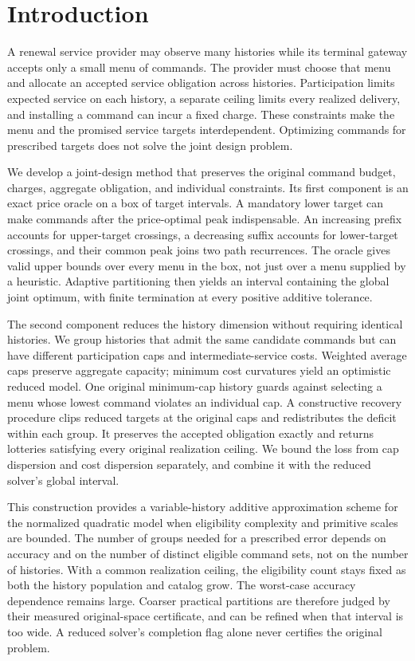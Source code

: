 \section{Introduction}
A renewal service provider may observe many histories while its terminal gateway accepts only a small menu of commands. The provider must choose that menu and allocate an accepted service obligation across histories. Participation limits expected service on each history, a separate ceiling limits every realized delivery, and installing a command can incur a fixed charge. These constraints make the menu and the promised service targets interdependent. Optimizing commands for prescribed targets does not solve the joint design problem.

We develop a joint-design method that preserves the original command budget, charges, aggregate obligation, and individual constraints. Its first component is an exact price oracle on a box of target intervals. A mandatory lower target can make commands after the price-optimal peak indispensable. An increasing prefix accounts for upper-target crossings, a decreasing suffix accounts for lower-target crossings, and their common peak joins two path recurrences. The oracle gives valid upper bounds over every menu in the box, not just over a menu supplied by a heuristic. Adaptive partitioning then yields an interval containing the global joint optimum, with finite termination at every positive additive tolerance.

The second component reduces the history dimension without requiring identical histories. We group histories that admit the same candidate commands but can have different participation caps and intermediate-service costs. Weighted average caps preserve aggregate capacity; minimum cost curvatures yield an optimistic reduced model. One original minimum-cap history guards against selecting a menu whose lowest command violates an individual cap. A constructive recovery procedure clips reduced targets at the original caps and redistributes the deficit within each group. It preserves the accepted obligation exactly and returns lotteries satisfying every original realization ceiling. We bound the loss from cap dispersion and cost dispersion separately, and combine it with the reduced solver's global interval.

This construction provides a variable-history additive approximation scheme for the normalized quadratic model when eligibility complexity and primitive scales are bounded. The number of groups needed for a prescribed error depends on accuracy and on the number of distinct eligible command sets, not on the number of histories. With a common realization ceiling, the eligibility count stays fixed as both the history population and catalog grow. The worst-case accuracy dependence remains large. Coarser practical partitions are therefore judged by their measured original-space certificate, and can be refined when that interval is too wide. A reduced solver's completion flag alone never certifies the original problem.

